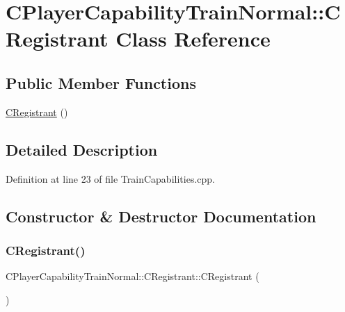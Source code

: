 \hypertarget{classCPlayerCapabilityTrainNormal_1_1CRegistrant}{}\section{C\+Player\+Capability\+Train\+Normal\+:\+:C\+Registrant Class Reference}
\label{classCPlayerCapabilityTrainNormal_1_1CRegistrant}
\subsection*{Public Member Functions}
\begin{DoxyCompactItemize}
\item 
\hyperlink{classCPlayerCapabilityTrainNormal_1_1CRegistrant_a1ff86d5f61a1e9e5e2b9892ac8664848}{C\+Registrant} ()
\end{DoxyCompactItemize}


\subsection{Detailed Description}


Definition at line 23 of file Train\+Capabilities.\+cpp.



\subsection{Constructor \& Destructor Documentation}
\hypertarget{classCPlayerCapabilityTrainNormal_1_1CRegistrant_a1ff86d5f61a1e9e5e2b9892ac8664848}{}\label{classCPlayerCapabilityTrainNormal_1_1CRegistrant_a1ff86d5f61a1e9e5e2b9892ac8664848} 
\subsubsection{\texorpdfstring{C\+Registrant()}{CRegistrant()}}
{\footnotesize\ttfamily C\+Player\+Capability\+Train\+Normal\+::\+C\+Registrant\+::\+C\+Registrant (\begin{DoxyParamCaption}{ }\end{DoxyParamCaption})}



